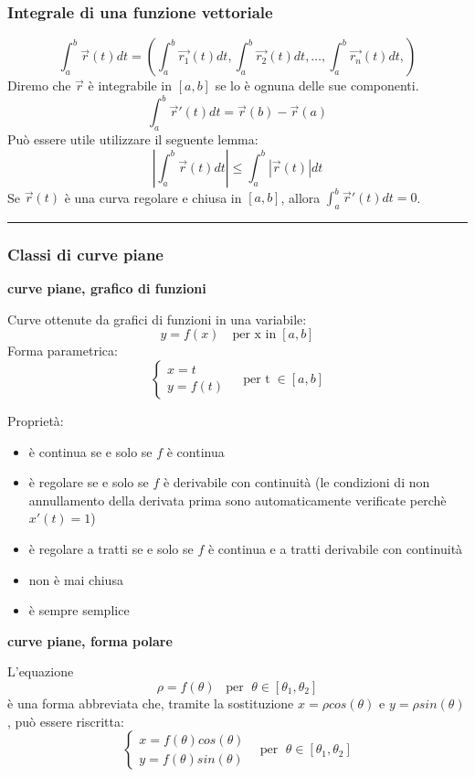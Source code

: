 \subsubsection{Integrale di una funzione vettoriale}
\[
    \int_{a}^{b} \vec{r}(t) dt =\left( \int_{a}^{b}\vec{r_1}(t) dt,\int_{a}^{b}\vec{r_2}(t) dt, \dots, \int_{a}^{b}\vec{r_n}(t) dt,\right)
\]
Diremo che $\vec{r}$ è integrabile in $[a,b]$ se lo è ognuna delle sue componenti.\newline
\[
    \int_{a}^{b} \vec{r}'(t) dt = \vec{r}(b) - \vec{r}(a)
\]
Può essere utile utilizzare il seguente lemma:
\[
    \left| \int_{a}^{b}\vec{r}(t)dt \right| \leq \int_{a}^{b}|\vec{r}(t)|dt
\]
Se $\vec{r}(t)$ è una curva regolare e chiusa in $[a,b]$, allora $\int_{a}^{b}\vec{r}'(t) dt =0$.\newline
\rule{\textwidth}{0,4pt}
\subsubsection{Classi di curve piane}
\textbf{curve piane, grafico di funzioni}
\begin{tcolorbox}
Curve ottenute da grafici di funzioni in una variabile:
\[
    y = f(x) \quad\text{per x in} \;[a,b]
\]
Forma parametrica:
\[
    \begin{cases}
        x=t \\
        y=f(t)
    \end{cases} \;\;\;\; \text{per t} \;\in[a,b]
\]
\end{tcolorbox}
Proprietà:
\begin{itemize}
    \item è continua se e solo se $f$ è continua
    \item è regolare se e solo se $f$ è derivabile con continuità (le condizioni di non annullamento della derivata prima sono automaticamente verificate perchè $x'(t) = 1$)
    \item è regolare a tratti se e solo se $f$ è continua e a tratti derivabile con continuità
    \item non è mai chiusa
    \item è sempre semplice
\end{itemize}
\textbf{curve piane, forma polare}\newline
\begin{tcolorbox}
L'equazione
\[
    \rho = f(\theta) \;\;\;\text{per } \; \theta \in [\theta_1, \theta_2]
\]
è una forma abbreviata che, tramite la sostituzione $x= \rho cos(\theta)$ e $y= \rho sin(\theta)$, può essere riscritta:
\[
    \begin{cases}
        x = f(\theta) cos(\theta)\\
        y = f(\theta) sin(\theta)
    \end{cases} \;\;\; \text{per } \; \theta \in [\theta_1, \theta_2]
\]
\end{tcolorbox}
